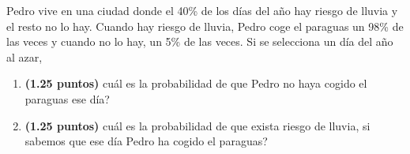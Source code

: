 
Pedro vive en una ciudad donde el 40\% de los días del año hay riesgo de lluvia y el resto no lo hay. Cuando hay riesgo de lluvia, Pedro coge el paraguas un 98\% de las veces y cuando no lo hay, un 5\% de las veces. Si se selecciona un día del año al azar,
\begin{enumerate}[label=\alph*)]
\item \textbf{(1.25 puntos)} \textquestiondown{}cuál es la probabilidad de que Pedro no haya cogido el paraguas ese día?
\item \textbf{(1.25 puntos)} \textquestiondown{}cuál es la probabilidad de que exista riesgo de lluvia, si sabemos que ese día Pedro ha cogido el paraguas?
\end{enumerate}
